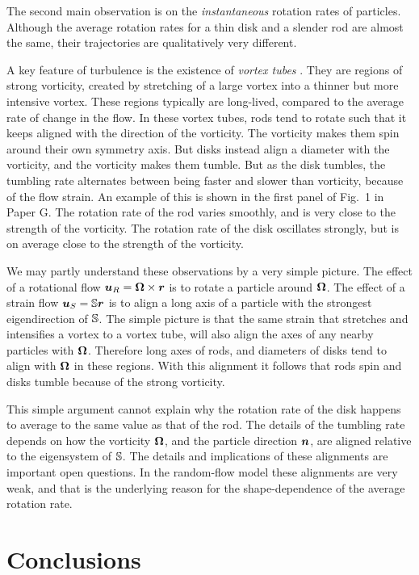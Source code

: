 \documentclass[thesis.tex]{subfiles}
\begin{document}
The second main observation is on the \emph{instantaneous} rotation rates of particles. Although the average rotation rates for a thin disk and a slender rod are almost the same, their trajectories are qualitatively very different.

A key feature of turbulence is the existence of \emph{vortex tubes} \cite{she1990}. They are regions of strong vorticity, created by stretching of a large vortex into a thinner but more intensive vortex. These regions typically are long-lived, compared to the average rate of change in the flow. In these vortex tubes, rods tend to rotate such that it keeps aligned with the direction of the vorticity. The vorticity makes them spin around their own symmetry axis. But disks instead align a diameter with the vorticity, and the vorticity makes them tumble. But as the disk tumbles, the tumbling rate alternates between being faster and slower than vorticity, because of the flow strain. An example of this is shown in the first panel of Fig.~1 in Paper G. The rotation rate of the rod varies smoothly, and is very close to the strength of the vorticity. The rotation rate of the disk oscillates strongly, but is on average close to the strength of the vorticity.

We may partly understand these observations by a very simple picture. The effect of a rotational flow $\mbox{\boldmath$u$}_R= \mbox{\boldmath$\Omega$} \times \mbox{\boldmath$r$}$ is to rotate a particle around $\mbox{\boldmath$\Omega$}$. The effect of a strain flow $\mbox{\boldmath$u$}_S=\mathbb{S} \mbox{\boldmath$r$}$ is to align a long axis of a particle with the strongest eigendirection of $\mathbb{S}$. The simple picture is that the same strain that stretches and intensifies a vortex to a vortex tube, will also align the axes of any nearby particles with $\mbox{\boldmath$\Omega$}$. Therefore long axes of rods, and diameters of disks tend to align with $\mbox{\boldmath$\Omega$}$ in these regions. With this alignment it follows that rods spin and disks tumble because of the strong vorticity.

This simple argument cannot explain why the rotation rate of the disk happens to average to the same value as that of the rod. The details of the tumbling rate depends on how the vorticity $\mbox{\boldmath$\Omega$}$, and the particle direction $\mbox{\boldmath$n$}$, are aligned relative to the eigensystem of $\mathbb{S}$. The details and implications of these alignments are important open questions. In the random-flow model these alignments are very weak, and that is the underlying reason for the shape-dependence of the average rotation rate.

\chapter{Conclusions}
\end{document}
